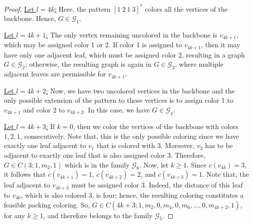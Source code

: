 \documentclass{article}
\begin{document}
\begin{proof}
\underline{Let $l=4k$:} Here, the pattern $[1\ 2\ 1\ 3]^{*}$ colors all the vertices of the backbone. Hence, $G \in \mathcal{G}_{1}$.


\underline{Let $l=4k+1$:} The only vertex remaining uncolored in the backbone is $v_{4k+1}$, which may be assigned color 1 or 2. If color 1 is assigned to $v_{4k+1}$, then it may have only one adjacent leaf, which must be assigned color 2, resulting in a graph $G\in \mathcal{G}_2$; otherwise, the resulting graph is again in  $G\in \mathcal{G}_2$, where multiple adjacent leaves are permissible for $v_{4k+1}$.


\underline{Let $l=4k+2$:} Now, we have two uncolored vertices in the backbone and the only possible extension of the pattern to those vertices is to assign color 1 to $v_{4k+1}$ and color 2 to $v_{4k+2}$.  
In this case, we have $G\in \mathcal{G}_4$.

\underline{Let $l=4k+3$:} If $k=0$, then we color the vertices of the backbone with colors $1,2,1$, consecutively. Note that, this is the only possible coloring since we have exactly one leaf adjacent to $v_1$ that is colored with 3. Moreover, $v_3$ has to be adjacent to exactly one leaf that is also assigned color 3. Therefore, $G \in C(3;1,m_2,1)$ which is in the family $\mathcal{G}_6$. 
Now, let $k\geq 1$. Since $c(v_{4k})=3$, it follows that $c(v_{4k+1})=1$, $c(v_{4k+2})=2$, and $c(v_{4k+3})=1$. Note that, the leaf adjacent to $v_{4k+3}$ must be assigned color 3. Indeed, the distance of this leaf to $v_{4k}$, which is also colored 3, is four; hence, the resulting coloring constitutes a feasible packing coloring. So, $G \in C(4k+3; 1, m_2, 0, m_4, 0, m_6, \ldots, 0, m_{4k+2},1)$, for any $k\geq 1$, and therefore belongs to the family $\mathcal{G}_5$.
    


\end{proof}
\end{document}
